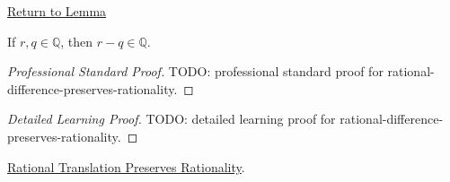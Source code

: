 \newpage
{}
\label{prf:rational-difference-preserves-rationality}

\begin{remark*}[Return]
\hyperref[lem:rational-difference-preserves-rationality]{Return to Lemma}
\end{remark*}

\begin{lemma*}
If $r,q\in\mathbb{Q}$, then $r-q\in\mathbb{Q}$.
\end{lemma*}

\begin{proof}[Professional Standard Proof]
\LRAProofBodyStart
TODO: professional standard proof for rational-difference-preserves-rationality.
\end{proof}

\begin{proof}[Detailed Learning Proof]
\LRAProofBodyStart
TODO: detailed learning proof for rational-difference-preserves-rationality.
\end{proof}

\begin{remark*}
\end{remark*}

\begin{dependencies}
\hyperref[lem:rational-translation-preserves-rationality]{Rational Translation Preserves Rationality}.
\end{dependencies}

\clearpage
